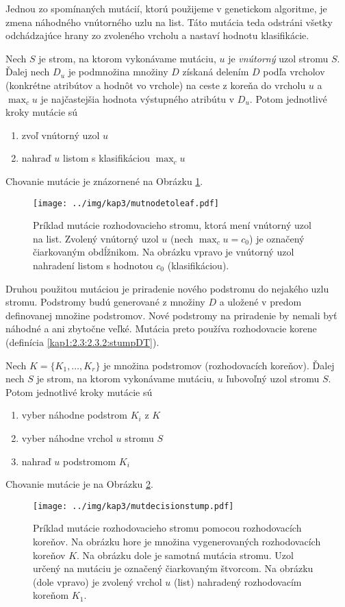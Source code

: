 Jednou zo spomínaných mutácií, ktorú použijeme v genetickom algoritme, je zmena náhodného vnútorného uzlu na list. Táto mutácia teda odstráni všetky odchádzajúce hrany zo zvoleného vrcholu a nastaví hodnotu klasifikácie.

Nech $S$ je strom, na ktorom vykonávame mutáciu, $u$ je \emph{vnútorný} uzol stromu $S$. Ďalej nech $D_u$ je podmnožina množiny $D$ získaná delením $D$ podľa vrcholov (konkrétne atribútov a hodnôt vo vrchole) na ceste z koreňa do vrcholu $u$ a $\max_c u$ je najčastejšia hodnota výstupného atribútu v $D_u$. Potom jednotlivé kroky mutácie sú
\begin{enumerate}
\item zvoľ vnútorný uzol $u$
\item nahraď $u$ listom s klasifikáciou $\max_c u$
\end{enumerate}
Chovanie mutácie je znázornené na Obrázku \ref{fig:mutnodetoleaf}.

\begin{figure}[h]
\centering
\centerline{\mbox{\texttt{[image: ../img/kap3/mutnodetoleaf.pdf]}}}
\caption{Príklad mutácie rozhodovacieho stromu, ktorá mení vnútorný uzol na list. Zvolený vnútorný uzol $u$ (nech $\max_c u = c_0$) je označený čiarkovaným obdĺžnikom. Na obrázku vpravo je vnútorný uzol nahradení listom s hodnotou $c_0$ (klasifikáciou).}\label{fig:mutnodetoleaf}
\end{figure}

Druhou použitou mutáciou je priradenie nového podstromu do nejakého uzlu stromu. Podstromy budú generované z množiny $D$ a uložené v predom definovanej množine podstromov. Nové podstromy na priradenie by nemali byť náhodné a ani zbytočne veľké. Mutácia preto používa rozhodovacie korene (definícia \ref{kap1:2.3:2.3.2:stumpDT}).

Nech $K=\{K_1,\ldots,K_r\}$ je množina podstromov (rozhodovacích koreňov). Ďalej nech $S$ je strom, na ktorom vykonávame mutáciu, $u$ ľubovoľný uzol stromu $S$. Potom jednotlivé kroky mutácie sú 
\begin{enumerate}
\item vyber náhodne podstrom $K_i$ z $K$
\item vyber náhodne vrchol $u$ stromu $S$
\item nahraď $u$ podstromom $K_i$
\end{enumerate}
Chovanie mutácie je na Obrázku \ref{fig:mutdecisionstump}.

\begin{figure}[h]
\centering
\centerline{\mbox{\texttt{[image: ../img/kap3/mutdecisionstump.pdf]}}}
\caption{Príklad mutácie rozhodovacieho stromu pomocou rozhodovacích koreňov. Na obrázku hore je množina vygenerovaných rozhodovacích koreňov $K$. Na obrázku dole je samotná mutácia stromu. Uzol určený na mutáciu je označený čiarkovaným štvorcom. Na obrázku (dole vpravo) je zvolený vrchol $u$ (list) nahradený rozhodovacím koreňom $K_1$. }\label{fig:mutdecisionstump}
\end{figure}